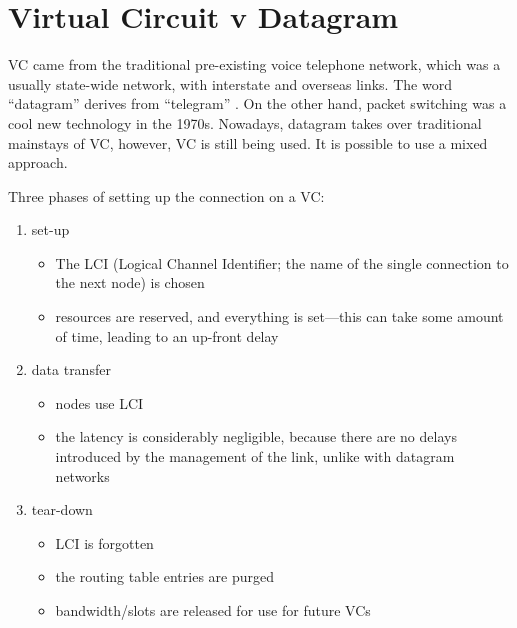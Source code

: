 \documentclass[10pt]{report}
\begin{document}
\chapter{Virtual Circuit v Datagram}
\thispagestyle{fancy}




VC came from the traditional pre-existing voice telephone network, which
was a usually state-wide network, with interstate and overseas links.
The word ``datagram'' derives from ``telegram'' \cite[p141]{russell}.  On the other hand, packet switching was a cool new technology in the 1970s.  Nowadays, datagram takes over traditional mainstays of VC, however, VC is still being used.  It is possible to use a mixed approach.

Three phases of setting up the connection on a VC:

\begin{enumerate}
\item set-up
    \begin{itemize}
    \item The LCI (Logical Channel Identifier; the name of the single
    connection to the next node) is chosen
    \item resources are reserved, and everything is set---this can take
    some amount of time, leading to an up-front delay
    \end{itemize}
\item data transfer
    \begin{itemize}
    \item nodes use LCI
    \item the latency is considerably negligible, because there are no delays introduced by the management of the link, unlike with datagram networks
    \end{itemize}
\item tear-down
    \begin{itemize}
	\item LCI is forgotten
	\item the routing table entries are purged
	\item bandwidth/slots are released for use for future VCs
    \end{itemize}
\end{enumerate}
\end{document}
